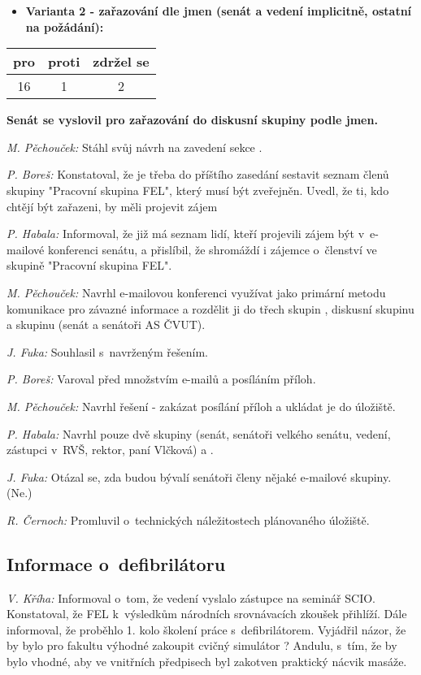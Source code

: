 \documentclass[a4paper,12pt,notitlepage,oneside]{article}
\newcommand{\hlasovani}[3]{\begin{center}
\begin{tabular}{|c|c|c|}\hline
pro& proti & zdržel se \\ \hline
#1 & #2 & #3 \\ \hline
\end{tabular}
\end{center}}
\begin{document}
\begin{itemize}
\item 
\textbf{Varianta 2 - zařazování dle jmen (senát a vedení implicitně, ostatní na požádání):}
\end{itemize}
\hlasovani{16}{1}{2}
\textbf{Senát se vyslovil pro zařazování do diskusní skupiny podle jmen.}

\textit{M. Pěchouček:} Stáhl svůj návrh na zavedení sekce .

\textit{P. Boreš:} Konstatoval, že je třeba do příštího zasedání sestavit seznam členů skupiny "Pracovní skupina FEL", který musí být zveřejněn. Uvedl, že ti, kdo chtějí být zařazeni, by měli projevit zájem

\textit{P. Habala:} Informoval, že již má seznam lidí, kteří projevili zájem být v~e-mailové konferenci senátu, a přislíbil, že shromáždí i zájemce o~členství ve skupině "Pracovní skupina FEL".

\textit{M. Pěchouček:} Navrhl e-mailovou konferenci využívat jako primární metodu komunikace pro závazné informace a rozdělit ji do třech skupin , diskusní skupinu  a skupinu  (senát a senátoři AS ČVUT).

\textit{J. Fuka:} Souhlasil s~navrženým řešením.

\textit{P. Boreš:} Varoval před množstvím e-mailů a posíláním příloh.

\textit{M. Pěchouček:} Navrhl řešení - zakázat posílání příloh a ukládat je do úložiště.

\textit{P. Habala:} Navrhl pouze dvě skupiny  (senát, senátoři velkého senátu, vedení, zástupci v~RVŠ, rektor, paní Vlčková) a .

\textit{J. Fuka:} Otázal se, zda budou bývalí senátoři členy nějaké e-mailové skupiny. (Ne.)

\textit{R. Černoch:} Promluvil o~technických náležitostech plánovaného úložiště.

\subsection{Informace o~defibrilátoru}
\textit{V. Kříha:} Informoval o~tom, že vedení vyslalo zástupce na seminář SCIO. Konstatoval, že FEL k~výsledkům národních srovnávacích zkoušek přihlíží. Dále informoval, že proběhlo 1. kolo školení práce s~defibrilátorem. Vyjádřil názor, že by bylo pro fakultu výhodné zakoupit cvičný simulátor ? Andulu, s~tím, že by bylo vhodné, aby ve vnitřních předpisech byl zakotven praktický nácvik masáže.
\end{document}
